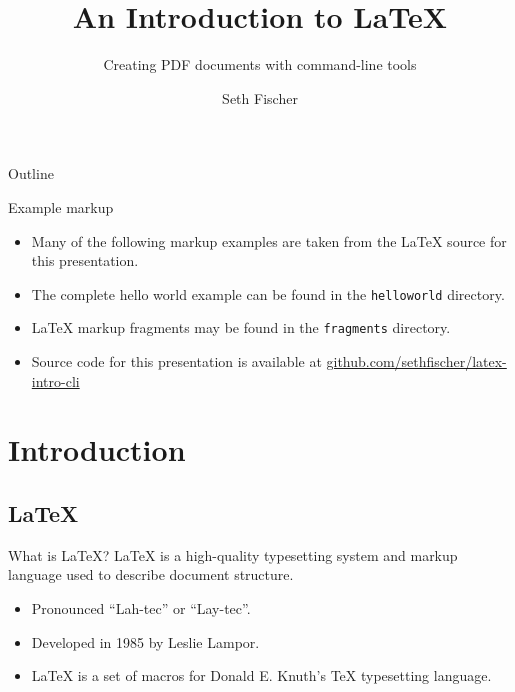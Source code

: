 \documentclass[compress]{beamer}
\title{An Introduction to \LaTeX{}}
\subtitle{Creating PDF documents with command-line tools}
\author[S. Fischer]{Seth Fischer}
\institute[github.com/sethfischer]{
    \href{https://github.com/sethfischer/}{github.com/sethfischer}
}
\newcommand{\syspath}[1] {{\tt #1}}
\begin{document}
\begin{frame}
    \titlepage
\end{frame}

\begin{frame}{Outline}
        \tableofcontents[hideallsubsections]
\end{frame}

\begin{frame}{Example markup}
    \begin{itemize}
        \item Many of the following markup examples are taken from the \LaTeX{} 
            source for this presentation.
        \item The complete hello world example can be found in the 
            \syspath{helloworld} directory.
        \item \LaTeX{} markup fragments may be found in the \syspath{fragments} 
            directory.
        \item Source code for this presentation is available at 
            \href{https://github.com/sethfischer/latex-intro-cli}
            {github.com/sethfischer/latex-intro-cli}
    \end{itemize}
\end{frame}


\section{Introduction}

\subsection{\LaTeX{}}

\begin{frame}{What is \LaTeX{}?}
    \LaTeX{} is a high-quality typesetting system and markup language used to 
    describe document structure.

    \begin{itemize}
        \item Pronounced ``Lah-tec'' or ``Lay-tec''.
        \item Developed in 1985 by Leslie Lampor.
        \item \LaTeX{} is a set of macros for Donald E. Knuth's \TeX{} 
            typesetting language.
    \end{itemize}
\end{frame}
\end{document}
